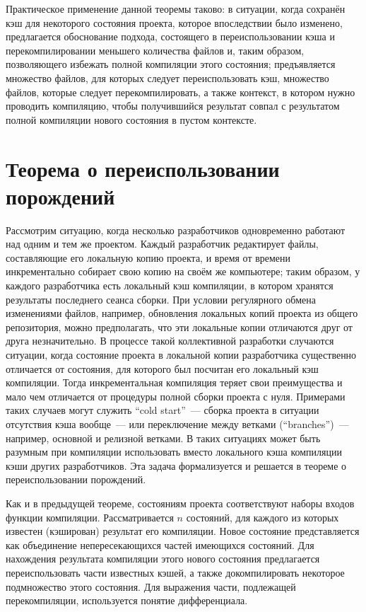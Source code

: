 Практическое применение данной теоремы таково: в ситуации, когда сохранён кэш для некоторого состояния проекта, которое впоследствии было изменено, предлагается обоснование подхода, состоящего в переиспользовании кэша и перекомпилировании меньшего количества файлов и, таким образом, позволяющего избежать полной компиляции этого состояния; предъявляется множество файлов, для которых следует переиспользовать кэш, множество файлов, которые следует перекомпилировать, а также контекст, в котором нужно проводить компиляцию, чтобы получившийся результат совпал с результатом полной компиляции нового состояния в пустом контексте.
 
\newpage
\section{Теорема о переиспользовании порождений}

Рассмотрим ситуацию, когда несколько разработчиков одновременно работают над одним и тем же проектом. Каждый разработчик редактирует файлы, составляющие его локальную копию проекта, и время от времени инкрементально собирает свою копию на своём же компьютере; таким образом, у каждого разработчика есть локальный кэш компиляции, в котором хранятся результаты последнего сеанса сборки. При условии регулярного обмена изменениями файлов, например, обновления локальных копий проекта из общего репозитория, можно предполагать, что эти локальные копии отличаются друг от друга незначительно. В процессе такой коллективной разработки случаются ситуации, когда состояние проекта в локальной копии разработчика существенно отличается от состояния, для которого был посчитан его локальный кэш компиляции. Тогда инкрементальная компиляция теряет свои преимущества и мало чем отличается от процедуры полной сборки проекта с нуля. Примерами таких случаев могут служить ``cold start''~--- сборка проекта в ситуации отсутствия кэша вообще~--- или переключение между ветками (``branches'')~--- например, основной и релизной ветками. В таких ситуациях может быть разумным при компиляции использовать вместо локального кэша компиляции кэши других разработчиков. Эта задача формализуется и решается в теореме о переиспользовании порождений.

Как и в предыдущей теореме, состояниям проекта соответствуют наборы входов функции компиляции. Рассматривается $n$ состояний, для каждого из которых известен (кэширован) результат его компиляции. Новое состояние представляется как объединение непересекающихся частей имеющихся состояний. Для нахождения результата компиляции этого нового состояния предлагается переиспользовать части известных кэшей, а также докомпилировать некоторое подмножество этого состояния. Для выражения части, подлежащей перекомпиляции, используется понятие дифференциала.\\

